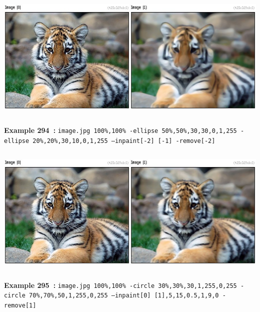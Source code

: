 \documentclass[a4paper,11pt,twoside]{book}
\begin{document}
\begin{center}\includegraphics[keepaspectratio=true,height=7cm,width=\textwidth]{img/gmic_def294.jpg}\\
{\footnotesize \textbf{Example 294~:} \texttt{image.jpg 100\%,100\% -ellipse 50\%,50\%,30,30,0,1,255 -ellipse 20\%,20\%,30,10,0,1,255 --inpaint[-2] [-1] -remove[-2]}}
\\\includegraphics[keepaspectratio=true,height=7cm,width=\textwidth]{img/gmic_def295.jpg}\\
{\footnotesize \textbf{Example 295~:} \texttt{image.jpg 100\%,100\% -circle 30\%,30\%,30,1,255,0,255 -circle 70\%,70\%,50,1,255,0,255 --inpaint[0] [1],5,15,0.5,1,9,0 -remove[1]}}
\end{center}
\end{document}
